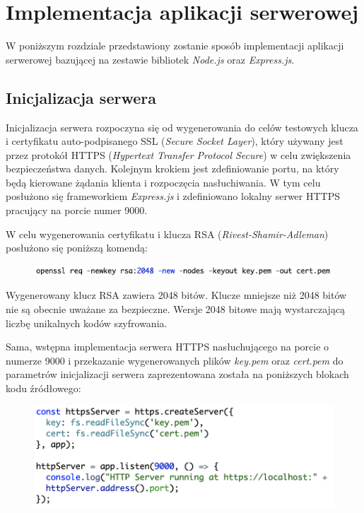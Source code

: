 \section{Implementacja aplikacji serwerowej}
W poniższym rozdziale przedstawiony zostanie sposób implementacji aplikacji serwerowej bazującej na zestawie bibliotek \textit{Node.js} oraz \textit{Express.js}.

\subsection{Inicjalizacja serwera}
Inicjalizacja serwera rozpoczyna się od wygenerowania do celów testowych klucza i certyfikatu auto-podpisanego SSL (\textit{Secure Socket Layer}), który używany jest przez protokół HTTPS (\textit{Hypertext Transfer Protocol Secure}) w celu zwiększenia bezpieczeństwa danych. Kolejnym krokiem jest zdefiniowanie portu, na który będą kierowane żądania klienta i rozpoczęcia nasłuchiwania. W tym celu posłużono się frameworkiem \textit{Express.js} i zdefiniowano lokalny serwer HTTPS pracujący na porcie numer 9000. 

W celu wygenerowania certyfikatu i klucza RSA (\textit{Rivest-Shamir-Adleman}) posłużono się poniższą komendą:

\begin{figure}[h]
	\includegraphics[scale=0.7]{images/code/openssl_newkey.png}
	\label{Rys:nodejs}
\end{figure}

Wygenerowany klucz RSA zawiera 2048 bitów. Klucze mniejsze niż 2048 bitów nie są obecnie uważane za bezpieczne. Wersje 2048 bitowe mają wystarczającą liczbę unikalnych kodów szyfrowania. 

Sama, wstępna implementacja serwera HTTPS nasłuchującego na porcie o numerze 9000 i przekazanie wygenerowanych plików \textit{key.pem} oraz \textit{cert.pem} do parametrów inicjalizacji serwera  zaprezentowana została na poniższych blokach kodu źródłowego:

\begin{figure}[h]
	\includegraphics[scale=0.7]{images/code/create_server.png}
	\label{Rys:nodejs}
\end{figure}

